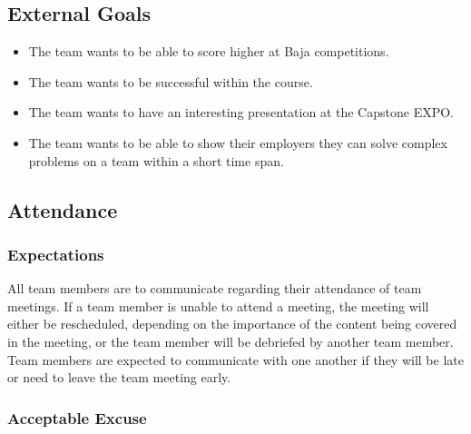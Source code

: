 \documentclass{article}
\begin{document}
\subsection*{External Goals}


\begin{itemize}
  \item The team wants to be able to score higher at Baja competitions.
  \item The team wants to be successful within the course.
  \item The team wants to have an interesting presentation at the Capstone EXPO.
  \item The team wants to be able to show their employers they can solve complex problems on a team within a short time span.
\end{itemize}

\subsection*{Attendance}

\subsubsection*{Expectations}

All team members are to communicate regarding their attendance of team meetings.
If a team member is unable to attend a meeting, the meeting will either be rescheduled, depending on the importance of the content being covered in the meeting, or the team member will be debriefed by another team member. 
Team members are expected to communicate with one another if they will be late or need to leave the team meeting early. 

\subsubsection*{Acceptable Excuse}

\end{document}
